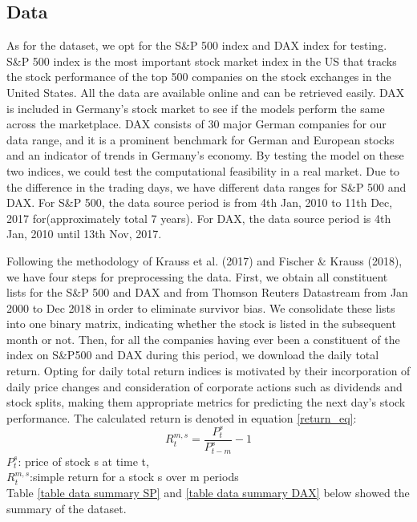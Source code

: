 \documentclass{article}
\begin{document}
\subsection{Data}
As for the dataset, we opt for the S\&P 500 index and DAX index for testing. S\&P 500 index is the most important stock market index in the US that tracks the stock performance of the top 500 companies on the stock exchanges in the United States. All the data are available online and can be retrieved easily. DAX is included in Germany's stock market to see if the models perform the same across the marketplace. DAX consists of 30 major German companies for our data range, and it is a prominent benchmark for German and European stocks and an indicator of trends in Germany's economy. By testing the model on these two indices, we could test the computational feasibility in a real market. Due to the difference in the trading days, we have different data ranges for S\&P 500 and DAX. For S\&P 500, the data source period is from 4th Jan, 2010 to 11th Dec, 2017 for(approximately total 7 years). For DAX, the data source period is  4th Jan, 2010 until 13th Nov, 2017.

Following the methodology of Krauss et al. (2017) and Fischer \& Krauss (2018), we have four steps for preprocessing the data. First, we obtain all constituent lists for the S\&P 500 and DAX and from Thomson Reuters Datastream from Jan 2000 to Dec 2018 in order to eliminate survivor bias. We consolidate these lists into one binary matrix, indicating whether the stock is listed in the subsequent month or not. Then, for all the companies having ever been a constituent of the index on S\&P500 and DAX during this period, we download the daily total return. Opting for daily total return indices is motivated by their incorporation of daily price changes and consideration of corporate actions such as dividends and stock splits, making them appropriate metrics for predicting the next day's stock performance. The calculated return is denoted in equation \ref{return_eq}:
\begin{equation}\label{return_eq}
    R^{m,s}_{t} = \frac {P^{s}_{t}}{{P^{s}_{t-m}}} - 1 
\end{equation}
$P^{s}_{t}$: price of stock s at time t,\\
$R^{m,s}_{t}$:simple return for a stock s over m periods\\

Table \ref{table data summary SP} and \ref{table data summary DAX} below showed the summary of the dataset. 
\end{document}
